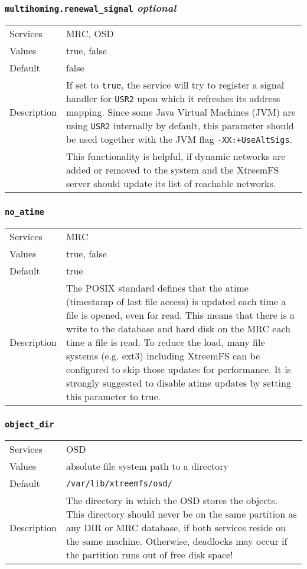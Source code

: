 \documentclass[a4paper,10pt]{book}
\begin{document}
\subsubsection{\texttt{multihoming.renewal\_signal} \textit{optional}}
\label{option:multihoming.renewalsignal}
\begin{tabular}{lp{10cm}}
 Services & MRC, OSD\\
 Values   & true, false\\
 Default  & false\\
 Description & If set to \texttt{true}, the service will try to register a signal handler for \texttt{USR2} upon which it refreshes its address mapping. Since some  Java Virtual Machines (JVM) are using \texttt{USR2} internally by default, this parameter should be used together with the JVM flag \texttt{-XX:+UseAltSigs}.\\
 & This functionality is helpful, if dynamic networks are added or removed to the system and the XtreemFS server should update its list of reachable networks.
 \end{tabular}

\subsubsection{\texttt{no\_atime}}
\begin{tabular}{lp{10cm}}
 Services & MRC\\
 Values   & true, false \\
 Default  & true\\
 Description & The POSIX standard defines that the atime (timestamp of last file access) is updated each time a file is opened, even for read. This means that there is a write to the database and hard disk on the MRC each time a file is read. To reduce the load, many file systems (e.g. ext3) including XtreemFS can be configured to skip those updates for performance. It is strongly suggested to disable atime updates by setting this parameter to true.
\end{tabular}

\subsubsection{\texttt{object\_dir}}
\begin{tabular}{lp{10cm}}
 Services & OSD\\
 Values   & absolute file system path to a directory\\
 Default  & \texttt{/var/lib/xtreemfs/osd/}\\
 Description & The directory in which the OSD stores the objects. This directory should never be on the same partition as any DIR or MRC database, if both services reside on the same machine. Otherwise, deadlocks may occur if the partition runs out of free disk space!
\end{tabular}
\end{document}
